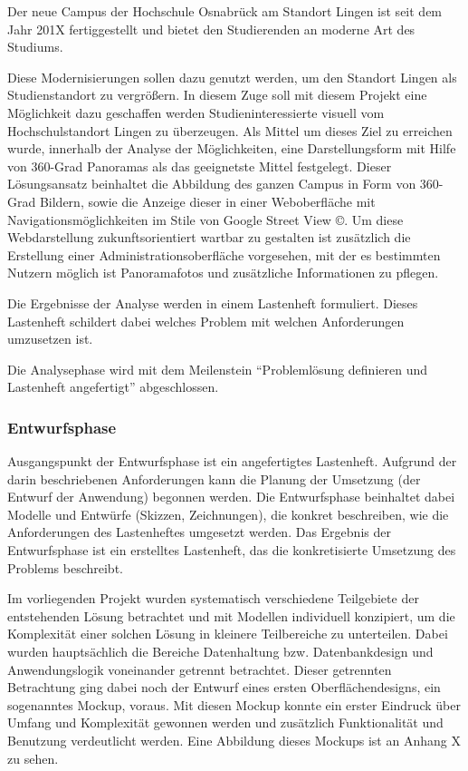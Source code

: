 Der neue Campus der Hochschule Osnabrück am Standort Lingen ist seit dem Jahr
201X fertiggestellt und bietet den Studierenden an moderne Art des Studiums.

Diese Modernisierungen sollen dazu genutzt werden, um den Standort Lingen als
Studienstandort zu vergrößern. In diesem Zuge soll mit diesem Projekt eine
Möglichkeit dazu geschaffen werden Studieninteressierte visuell vom
Hochschulstandort Lingen zu überzeugen. Als Mittel um dieses Ziel zu erreichen
wurde, innerhalb der Analyse der Möglichkeiten, eine Darstellungsform mit Hilfe
von 360-Grad Panoramas  als das geeignetste Mittel festgelegt.
Dieser Lösungsansatz beinhaltet die Abbildung des ganzen Campus in Form von
360-Grad Bildern, sowie die Anzeige dieser in einer Weboberfläche mit
Navigationsmöglichkeiten im Stile von Google Street View \copyright. Um diese
Webdarstellung zukunftsorientiert wartbar zu gestalten ist zusätzlich die
Erstellung einer Administrationsoberfläche vorgesehen, mit der es bestimmten
Nutzern möglich ist Panoramafotos und zusätzliche Informationen zu pflegen.

Die Ergebnisse der Analyse werden in einem Lastenheft formuliert. Dieses
Lastenheft schildert dabei welches Problem mit welchen Anforderungen umzusetzen
ist.

Die Analysephase wird mit dem Meilenstein "`Problemlösung definieren und
Lastenheft angefertigt"' abgeschlossen.


\subsubsection{Entwurfsphase}
\label{sec:Entwurfsphase}

Ausgangspunkt der Entwurfsphase ist ein angefertigtes Lastenheft. Aufgrund der
darin beschriebenen Anforderungen kann die Planung der Umsetzung (der Entwurf
der Anwendung) begonnen werden. Die Entwurfsphase beinhaltet dabei Modelle und
Entwürfe (Skizzen, Zeichnungen), die konkret beschreiben, wie die Anforderungen
des Lastenheftes umgesetzt werden. Das Ergebnis der Entwurfsphase ist ein
erstelltes Lastenheft, das die konkretisierte Umsetzung des Problems
beschreibt.

Im vorliegenden Projekt wurden systematisch verschiedene Teilgebiete der
entstehenden Lösung betrachtet und mit Modellen individuell konzipiert, um die
Komplexität einer solchen Lösung in kleinere Teilbereiche zu unterteilen. Dabei
wurden hauptsächlich die Bereiche Datenhaltung bzw. Datenbankdesign und
Anwendungslogik voneinander getrennt betrachtet. Dieser getrennten Betrachtung
ging dabei noch der Entwurf eines ersten Oberflächendesigns, ein sogenanntes
Mockup, voraus. Mit diesen Mockup konnte ein erster Eindruck über Umfang und
Komplexität gewonnen werden und zusätzlich Funktionalität und Benutzung
verdeutlicht werden. Eine Abbildung dieses Mockups ist an Anhang X zu sehen.


